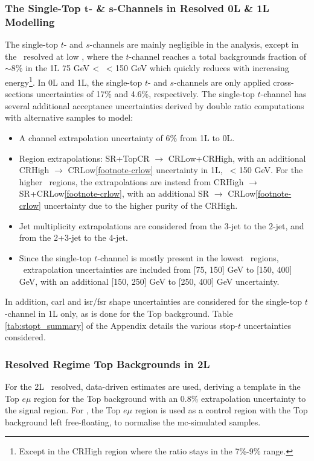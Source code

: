 \subsubsection{The Single-Top $\boldsymbol{t}$- \& $\boldsymbol{s}$-Channels in Resolved 0L \& 1L Modelling}
The single-top $t$- and $s$-channels are mainly negligible in the analysis, except in the \vhb\ resolved at low \ptv, where the $t$-channel reaches a total backgrounds fraction of $\sim$8\% in the 1L 75 GeV < \ptv\ < 150 GeV which quickly reduces with increasing energy\footnote{Except in the CRHigh region where the ratio stays in the 7\%-9\% range.}. In 0L and 1L, the single-top $t$- and $s$-channels are only applied cross-sections uncertainties of 17\% and 4.6\%, respectively. The single-top $t$-channel has several additional acceptance uncertainties derived by double ratio computations with alternative samples to model: 
\begin{itemize}
    \item A channel extrapolation uncertainty of 6\% from 1L to 0L.
    \item Region extrapolations: SR+TopCR $\rightarrow$ CRLow+CRHigh, with an additional CRHigh $\rightarrow$ CRLow\cref{footnote-crlow} uncertainty in 1L, \ptv\ < 150 GeV. For the higher \ptv\ regions, the extrapolations are instead from CRHigh $\rightarrow$ SR+CRLow\cref{footnote-crlow}, with an additional SR $\rightarrow$ CRLow\cref{footnote-crlow} uncertainty due to the higher purity of the CRHigh.
    \item Jet multiplicity extrapolations are considered from the 3-jet to the 2-jet, and from the 2+3-jet to the 4-jet.
    \item Since the single-top $t$-channel is mostly present in the lowest \ptv\ regions, \ptv\ extrapolation uncertainties are included from [75, 150] GeV to [150, 400] GeV, with an additional [150, 250] GeV to [250, 400] GeV uncertainty.
\end{itemize}
In addition, \gls{carl} and \gls{isr}/\gls{fsr} shape uncertainties are considered for the single-top $t$-channel in 1L only, as is done for the Top background. Table \ref{tab:stopt_summary} of the Appendix details the various stop-$t$ uncertainties considered.

\subsubsection{Resolved Regime Top Backgrounds in 2L} 
For the 2L \vhb\ resolved, data-driven estimates are used, deriving a template in the Top $e\mu$ region for the Top background with an 0.8\% extrapolation uncertainty to the signal region. For \vhc, the Top $e\mu$ region is used as a control region with the Top background left free-floating, to normalise the \gls{mc}-simulated samples.

